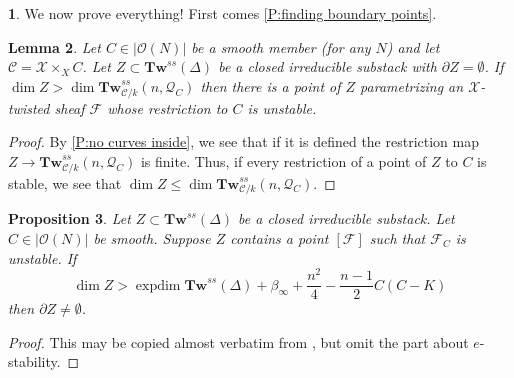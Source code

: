 \documentclass[11pt]{amsart}
\newcommand{\ms}[1]{\mathscr #1}
\renewcommand{\[}{[\!\hspace{0.03em}[}
\renewcommand{\]}{]\!\hspace{0.03em}]}
\renewcommand{\(}{(\!\hspace{0.03em}(}
\renewcommand{\)}{)\!\hspace{0.03em})}
\newcommand{\Tw}{\mathbf{Tw}}
\DeclareMathOperator{\expdim}{exp dim}
\newtheorem{lem}{Lemma}[subsubsection]%
\newtheorem{prop}[lem]{Proposition}
\theoremstyle{definition}
\newtheorem{para}[lem]{\indent}
\theoremstyle{remark}
\begin{document}
\begin{para}\label{Para:proofs} We now prove everything!  First comes \ref{P:finding boundary points}.
\end{para}

\begin{lem}\label{L:unstable restriction} Let $C\in|{\ms O}(N)|$ be a smooth 
member (for any $N$) and let $\ms C=\ms X\times_{X}C$.  Let $Z\subset\Tw^{ss}(\Delta)$ 
be a closed irreducible substack with $\partial Z=\emptyset$.  If $\dim 
Z>\dim\Tw^{ss}_{\ms C/k}(n,\ms Q_{C})$ then there is a point of $Z$ 
parametrizing an $\ms X$-twisted sheaf $\ms F$ whose restriction to $C$ is unstable.
\end{lem}
\begin{proof} By \ref{P:no curves inside}, we see that if it is 
defined the restriction map $Z\to\Tw^{ss}_{\ms C/k}(n,\ms Q_{C})$ is 
finite.  Thus, if every restriction of a point of $Z$ to $C$ is 
stable, we see that $\dim Z\leq\dim\Tw^{ss}_{\ms C/k}(n,\ms Q_{C})$.
\end{proof}


\begin{prop}\label{P:unstable restriction makes boundary} Let 
$Z\subset\Tw^{ss}(\Delta)$ be a closed irreducible substack.  
Let $C\in|{\ms O}(N)|$ be smooth.  Suppose $Z$ contains a point $[\ms F]$ 
such that $\ms F_{C}$ is unstable.  If 
$$\dim Z>\expdim\Tw^{ss}(\Delta)+\beta_{\infty}+\frac{n^{2}}{4}-\frac{n-1}{2}C(C-K)$$
then $\partial Z\neq\emptyset$.
\end{prop}
\begin{proof} This may be copied almost verbatim from \cite[9.5.4]{h-l}, but omit 
the part about $e$-stability.
\end{proof}
\end{document}
